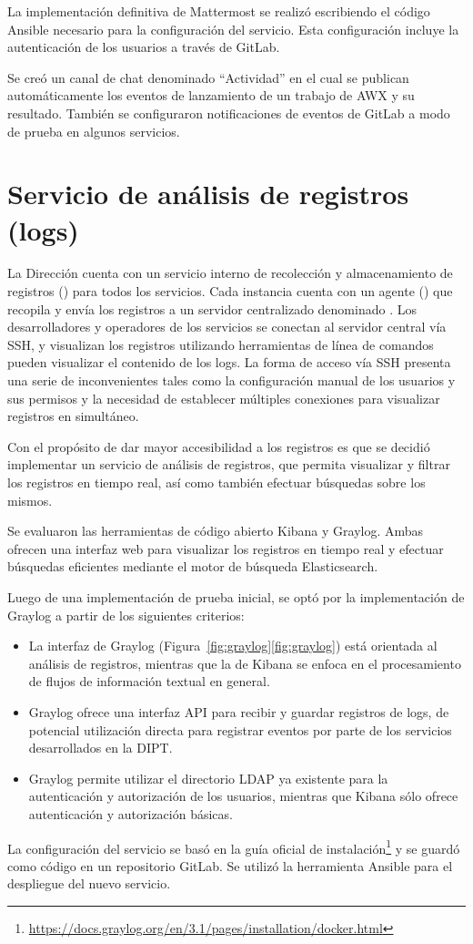 La implementación definitiva de Mattermost se realizó escribiendo el
código Ansible necesario para la configuración del servicio. Esta
configuración incluye la autenticación de los usuarios a través de
GitLab.

Se creó un canal de chat denominado ``Actividad'' en el cual se publican
automáticamente los eventos de lanzamiento de un trabajo de AWX y su
resultado. También se configuraron notificaciones de eventos de GitLab
a modo de prueba en algunos servicios.
%
%
\section{Servicio de análisis de registros (logs)}
%
La Dirección cuenta con un servicio interno de recolección y
almacenamiento de registros () para todos los servicios. Cada
instancia cuenta con un agente () que recopila y envía
los registros a un servidor centralizado denominado
. Los desarrolladores y operadores de los servicios se
conectan al servidor central  vía SSH, y visualizan
los registros utilizando herramientas de línea de comandos pueden
visualizar el contenido de los logs. La forma de acceso vía SSH
presenta una serie de inconvenientes tales como la configuración
manual de los usuarios y sus permisos y la necesidad de establecer
múltiples conexiones para visualizar registros en simultáneo.

Con el propósito de dar mayor accesibilidad a los registros es que se
decidió implementar un servicio de análisis de registros, que permita
visualizar y filtrar los registros en tiempo real, así como también
efectuar búsquedas sobre los mismos.

Se evaluaron las herramientas de código abierto Kibana y
Graylog. Ambas ofrecen una interfaz web para visualizar los registros
en tiempo real y efectuar búsquedas eficientes mediante el motor de
búsqueda Elasticsearch.

Luego de una implementación de prueba inicial, se optó por la
implementación de Graylog a partir de los siguientes criterios:
%
\begin{itemize}
\item La interfaz de Graylog
  (\iflatexml{}Figura~\ref{fig:graylog}\else\autoref{fig:graylog}\fi{})
  está orientada al análisis de registros,
  mientras que la de Kibana se enfoca en el procesamiento de flujos de
  información textual en general.
\item Graylog ofrece una interfaz API para recibir y guardar registros
  de logs, de potencial utilización directa para registrar eventos por
  parte de los servicios desarrollados en la DIPT.
\item Graylog permite utilizar el directorio LDAP ya existente para la
  autenticación y autorización de los usuarios, mientras que Kibana
  sólo ofrece autenticación y autorización básicas.
\end{itemize}
%
La configuración del servicio se basó en la guía oficial de
instalación\footnote{\url{https://docs.graylog.org/en/3.1/pages/installation/docker.html}}
y se guardó como código en un repositorio GitLab. Se utilizó la
herramienta Ansible para el despliegue del nuevo servicio.
